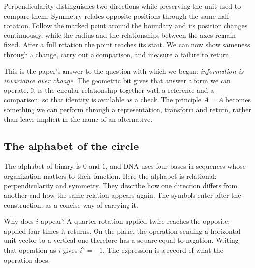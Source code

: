 \documentclass[11pt,a4paper]{article}
\begin{document}
Perpendicularity distinguishes two directions while preserving the unit used
to compare them. Symmetry relates opposite positions through the same
half-rotation. Follow the marked point around the boundary and its position
changes continuously, while the radius and the relationships between the axes
remain fixed. After a full rotation the point reaches its start. We can now
show sameness through a change, carry out a comparison, and measure a failure
to return.

This is the paper's answer to the question with which we began:
\emph{information is invariance over change}. The geometric bit gives that
answer a form we can operate. It is the circular relationship together with a
reference and a comparison, so that identity is available as a check. The
principle $A=A$ becomes something we can perform through a representation,
transform and return, rather than leave implicit in the name of an alternative.

\subsection{The alphabet of the circle}
The alphabet of binary is $0$ and $1$, and DNA uses four bases in sequences
whose organization matters to their function. Here the alphabet is relational:
perpendicularity and symmetry. They describe how one direction differs from
another and how the same relation appears again. The symbols enter after the
construction, as a concise way of carrying it.

Why does $i$ appear? A quarter rotation applied twice reaches the opposite;
applied four times it returns. On the plane, the operation sending a horizontal
unit vector to a vertical one therefore has a square equal to negation.
Writing that operation as $i$ gives $i^2=-1$. The expression is a record of
what the operation does.
\end{document}
